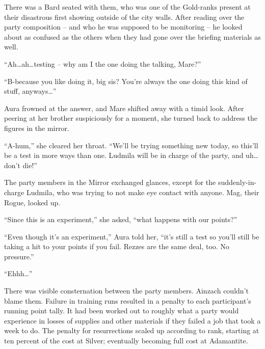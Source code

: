  

There was a Bard seated with them, who was one of the Gold-ranks present at their disastrous first showing outside of the city walls. After reading over the party composition – and who he was supposed to be monitoring – he looked about as confused as the others when they had gone over the briefing materials as well.

 

“Ah…ah…testing – why am I the one doing the talking, Mare?”

 

“B-because you like doing it, big sis? You’re always the one doing this kind of stuff, anyways…”

 

Aura frowned at the answer, and Mare shifted away with a timid look. After peering at her brother suspiciously for a moment, she turned back to address the figures in the mirror.

 

“A-hum,” she cleared her throat. “We’ll be trying something new today, so this’ll be a test in more ways than one. Ludmila will be in charge of the party, and uh…don’t die!”

 

The party members in the Mirror exchanged glances, except for the suddenly-in-charge Ludmila, who was trying to not make eye contact with anyone. Mag, their Rogue, looked up.

 

“Since this is an experiment,” she asked, “what happens with our points?”

 

“Even though it’s an experiment,” Aura told her, “it’s still a test so you’ll still be taking a hit to your points if you fail. Rezzes are the same deal, too. No pressure.”

 

“Ehhh…”

 

There was visible consternation between the party members. Ainzach couldn’t blame them. Failure in training runs resulted in a penalty to each participant’s running point tally. It had been worked out to roughly what a party would experience in losses of supplies and other materials if they failed a job that took a week to do. The penalty for resurrections scaled up according to rank, starting at ten percent of the cost at Silver; eventually becoming full cost at Adamantite.

 

